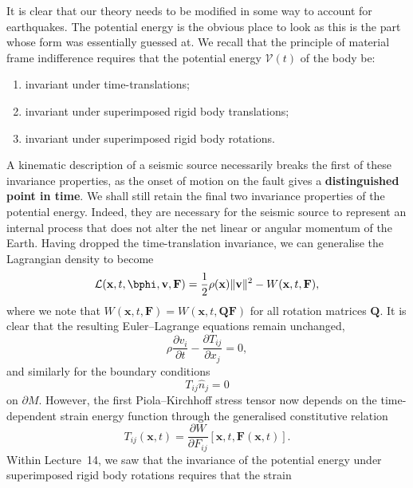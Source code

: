 It is clear that our theory needs to be modified in some way to account for earthquakes. The potential energy is the obvious place to look 
as this is the part whose form was essentially guessed at. We recall that the principle of material frame indifference requires that 
the potential energy $\mathcal{V}(t)$ of the body be:
\begin{enumerate}
    \item invariant under time-translations;
    \item invariant under superimposed rigid body translations;
    \item invariant under superimposed rigid body rotations.
\end{enumerate}
A kinematic description of a seismic source necessarily breaks the first of these invariance properties, as the onset of motion on 
the fault gives a \textbf{distinguished point in time}. We shall still retain the final two invariance properties of the potential 
energy. Indeed, they are necessary for the seismic source to represent an internal process that does not alter the net linear or 
angular momentum of the Earth. Having dropped the time-translation invariance, we can generalise the Lagrangian density to become
\begin{equation}\label{eq:6}
\mathcal{L}(\mathbf{x}, t, \bphi, \mathbf{v}, \mathbf{F}) = \frac{1}{2}\rho(\mathbf{x})\|\mathbf{v}\|^2 - W(\mathbf{x}, t, \mathbf{F}),
\end{equation}
where we note that $W(\mathbf{x}, t, \mathbf{F}) = W(\mathbf{x}, t, \mathbf{Q}\mathbf{F})$ for all rotation matrices $\mathbf{Q}$. It is 
clear that the resulting Euler--Lagrange equations remain unchanged,
\begin{equation}\label{eq:7}
\rho\frac{\partial v_{i}}{\partial t} - \frac{\partial T_{ij}}{\partial x_{j}} = 0,
\end{equation}
and similarly for the boundary conditions
\begin{equation}\label{eq:8}
T_{ij}\hat{n}_{j} = 0
\end{equation}
on $\partial M$. However, the first Piola--Kirchhoff stress tensor now depends on the time-dependent strain energy function through the 
generalised constitutive relation
\begin{equation}\label{eq:9}
T_{ij}(\mathbf{x}, t) = \frac{\partial W}{\partial F_{ij}}[\mathbf{x}, t, \mathbf{F}(\mathbf{x}, t)].
\end{equation}
Within Lecture~14, we saw that the invariance of the potential energy under superimposed rigid body rotations requires that the strain 
